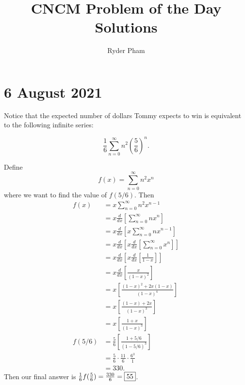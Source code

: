 \documentclass[letterpaper,oneside]{book}
\begin{document}
\title{CNCM Problem of the Day Solutions}
\author{Ryder Pham}
\maketitle

\section*{6 August 2021}

Notice that the expected number of dollars Tommy expects to win is equivalent to the following infinite series:

$$\frac16 \sum_{n=0}^\infty n^2\left(\frac56\right)^n.$$

Define
$$f(x) = \sum_{n=0}^\infty n^2x^n$$
where we want to find the value of $f(5/6)$.
Then
\begin{align*}
    f(x)   & = x\sum_{n=0}^\infty n^2x^{n-1}                                             \\
           & = x\frac{d}{dx}\left[\sum_{n=0}^\infty nx^n\right]                          \\
           & = x\frac{d}{dx}\left[x\sum_{n=0}^\infty nx^{n-1}\right]                     \\
           & = x\frac{d}{dx}\left[x\frac{d}{dx}\left[\sum_{n=0}^\infty x^n\right]\right] \\
           & = x\frac{d}{dx}\left[x\frac{d}{dx}\left[\frac{1}{1-x}\right]\right]         \\
           & = x\frac{d}{dx}\left[\frac{x}{(1-x)^2}\right]                               \\
           & = x\left[\frac{(1-x)^2+2x(1-x)}{(1-x)^4}\right]                             \\
           & = x\left[\frac{(1-x)+2x}{(1-x)^3}\right]                                    \\
           & = x\left[\frac{1+x}{(1-x)^3}\right]                                         \\
    f(5/6) & = \frac56 \left[\frac{1+5/6}{(1-5/6)^3}\right]                              \\
           & = \frac56 \cdot \frac{11}{6} \cdot \frac{6^3}{1}                            \\
           & = 330.
\end{align*}
Then our final answer is $\frac16 f(\frac56) = \frac{330}{6}= \fbox{55}$.
\end{document}
